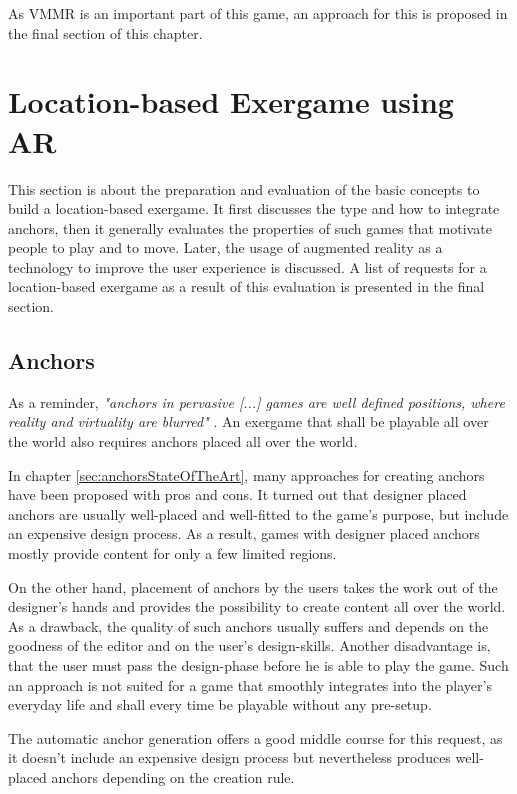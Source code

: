 As VMMR is an important part of this game, an approach for this is proposed in the final section of this chapter.


\section{Location-based Exergame using AR}
This section is about the preparation and evaluation of the basic concepts to build a location-based exergame. It first discusses the type and how to integrate anchors, then it generally evaluates the properties of such games that motivate people to play and to move. Later, the usage of augmented reality as a technology to improve the user experience is discussed. A list of requests for a location-based exergame as a result of this evaluation is presented in the final section.

\subsection{Anchors}\label{sec:anchorsConcept}
As a reminder, \emph{"anchors in pervasive [...] games are well defined positions, where reality and virtuality are blurred"} \citep{hock2014augmented}. An exergame that shall be playable all over the world also requires anchors placed all over the world.

In chapter \ref{sec:anchorsStateOfTheArt}, many approaches for creating anchors have been proposed with pros and cons. It turned out that designer placed anchors are usually well-placed and well-fitted to the game's purpose, but include an expensive design process. As a result, games with designer placed anchors mostly provide content for only a few limited regions.

On the other hand, placement of anchors by the users takes the work out of the designer's hands and provides the possibility to create content all over the world. As a drawback, the quality of such anchors usually suffers and depends on the goodness of the editor and on the user's design-skills. Another disadvantage is, that the user must pass the design-phase before he is able to play the game. Such an approach is not suited for a game that smoothly integrates into the player's everyday life and shall every time be playable without any pre-setup.

The automatic anchor generation offers a good middle course for this request, as it doesn't include an expensive design process but nevertheless produces well-placed anchors depending on the creation rule.

